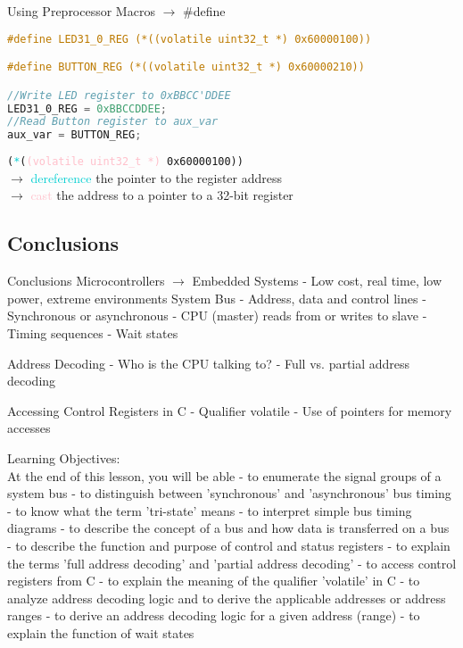 \begin{examplecode}{Using Preprocessor Macros} $\rightarrow$ \#define
\begin{lstlisting}[language=C, style=basesmol]
#define LED31_0_REG (*((volatile uint32_t *) 0x60000100))

#define BUTTON_REG (*((volatile uint32_t *) 0x60000210))

//Write LED register to 0xBBCC'DDEE
LED31_0_REG = 0xBBCCDDEE;
//Read Button register to aux_var
aux_var = BUTTON_REG;
\end{lstlisting}
    \vspace{2mm}
    \texttt{(\textcolor{darkturquoise}{*}(\textcolor{pink}{(volatile\ uint32\_t *)} 0x60000100))}\\
    $\rightarrow$ \textcolor{darkturquoise}{dereference} the pointer to the register address\\
    $\rightarrow$ \textcolor{pink}{cast} the address to a pointer to a 32-bit register
\end{examplecode}





\subsection{Conclusions}
\begin{KR}{Conclusions}
    Microcontrollers $\rightarrow$ Embedded Systems
- Low cost, real time, low power, extreme environments System Bus
- Address, data and control lines
- Synchronous or asynchronous
- CPU (master) reads from or writes to slave
- Timing sequences
- Wait states

Address Decoding
- Who is the CPU talking to?
- Full vs. partial address decoding

Accessing Control Registers in C
- Qualifier volatile
- Use of pointers for memory accesses
\end{KR}

\begin{remark}
    Learning Objectives:\\
    At the end of this lesson, you will be able
- to enumerate the signal groups of a system bus
- to distinguish between 'synchronous' and 'asynchronous' bus timing
- to know what the term 'tri-state' means
- to interpret simple bus timing diagrams
- to describe the concept of a bus and how data is transferred on a bus
- to describe the function and purpose of control and status registers
- to explain the terms 'full address decoding' and 'partial address decoding'
- to access control registers from C
- to explain the meaning of the qualifier 'volatile' in C
- to analyze address decoding logic and to derive the applicable addresses or address ranges
- to derive an address decoding logic for a given address (range)
- to explain the function of wait states
\end{remark}















